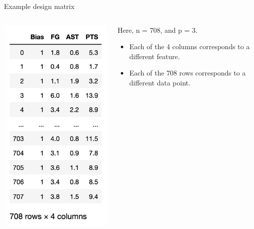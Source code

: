 \documentclass[aspectratio=169]{../latex_main/tntbeamer}  %
\begin{document}
	
	\begin{frame}{Example design matrix}
	
	  \begin{columns}
	  
	      \begin{column}{.5\textwidth}
	      
	            \centering
	            \includegraphics[scale=.4]{Bild1}
	            
	      \end{column}
	      
	      \begin{column}{.4\textwidth}
	      
	            Here, n = 708, and p = 3.
	            
	            \begin{itemize}
	                \item Each of the 4 columns corresponds to a different feature.
	                \item Each of the 708 rows corresponds to a different data point.
	            \end{itemize}
	            
	      \end{column}
	      
	  \end{columns}
	  
	\end{frame}
	
\end{document}
